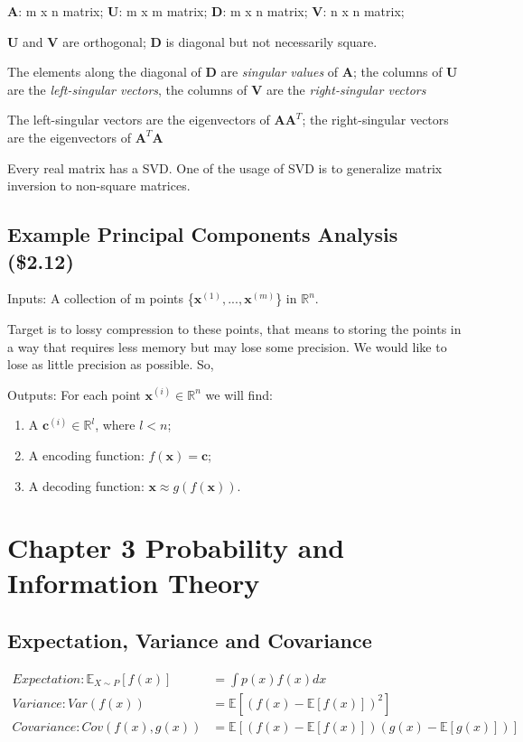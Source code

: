 \documentclass[12pt]{article}
\numberwithin{equation}{section}
\begin{document}
\textbf{A}: m x n matrix; \textbf{U}: m x m matrix; \textbf{D}: m x n matrix;  \textbf{V}: n x n matrix; 

\textbf{U} and \textbf{V} are orthogonal; \textbf{D} is diagonal but not necessarily square.

The elements along the diagonal of \textbf{D} are \emph{singular values} of \textbf{A};
the columns of \textbf{U} are the \emph{left-singular vectors}, the columns of \textbf{V} are the \emph{right-singular vectors}

The left-singular vectors are the eigenvectors of $\mathbf{AA}^T$; the right-singular vectors are the eigenvectors of $\mathbf{A}^T\mathbf{A}$

Every real matrix has a SVD. One of the usage of SVD is to generalize matrix inversion to non-square matrices.
\subsection{Example Principal Components Analysis (\$2.12)}
Inputs: A collection of m points \{$\mathbf{x}^{(1)},...,\mathbf{x}^{(m)}$\} in $\mathbb{R}^{n}$.

Target is to lossy compression to these points, that means to storing the points in a way that requires less memory but may lose some precision. We would like to lose as little precision as possible. So,

Outputs: For each point $\mathbf{x}^{(i)} \in \mathbb{R}^{n}$ we will find:
\begin{enumerate}
	\item A $\mathbf{c}^{(i)} \in \mathbb{R}^{l}$, where $l < n$;
	\item A encoding function: $f(\mathbf{x})=\mathbf{c}$; 
	\item A decoding function: $\mathbf{x} \approx g(f(\mathbf{x}))$.
\end{enumerate}
\section{Chapter 3 Probability and Information Theory}
\subsection{Expectation, Variance and Covariance}
\begin{align*}
Expectation: \mathbb{E}_{X \sim P}[f(x)]&=\int p(x)f(x)dx \\
Variance: Var(f(x))&=\mathbb{E}[(f(x)-\mathbb{E}[f(x)])^2] \\
Covariance: Cov(f(x),g(x))&=\mathbb{E}[(f(x)-\mathbb{E}[f(x)])(g(x)-\mathbb{E}[g(x)])]
\end{align*}
\end{document}
